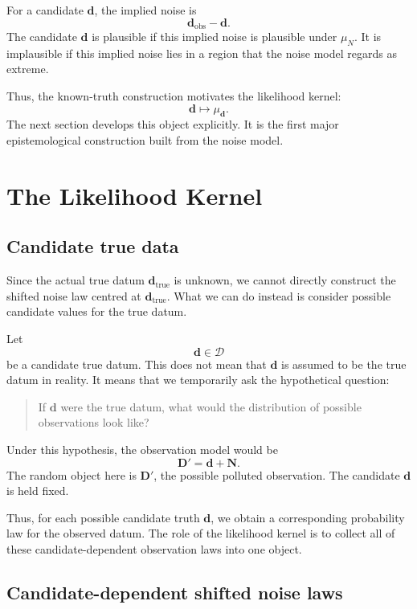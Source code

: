 \documentclass[11pt]{article}
\newcommand{\Dspace}{\mathcal D}
\newcommand{\muN}{\mu_N}
\newcommand{\Dobsrand}{\mathbf D'}
\newcommand{\Nrand}{\mathbf N}
\newcommand{\dtrue}{\mathbf d_{\mathrm{true}}}
\newcommand{\dobs}{\mathbf d_{\mathrm{obs}}}
\begin{document}
For a candidate \(\mathbf d\), the implied noise is
\[
    \dobs-\mathbf d.
\]
The candidate \(\mathbf d\) is plausible if this implied noise is plausible under \(\muN\). It is implausible if this implied noise lies in a region that the noise model regards as extreme.

Thus, the known-truth construction motivates the likelihood kernel:
\[
    \mathbf d
    \longmapsto
    \mu_{\mathbf d}.
\]
The next section develops this object explicitly. It is the first major epistemological construction built from the noise model.

\section{The Likelihood Kernel}

\subsection{Candidate true data}

Since the actual true datum \(\dtrue\) is unknown, we cannot directly construct the shifted noise law centred at \(\dtrue\). What we can do instead is consider possible candidate values for the true datum.

Let
\[
    \mathbf d\in\Dspace
\]
be a candidate true datum. This does not mean that \(\mathbf d\) is assumed to be the true datum in reality. It means that we temporarily ask the hypothetical question:

\begin{quote}
    If \(\mathbf d\) were the true datum, what would the distribution of possible observations look like?
\end{quote}

Under this hypothesis, the observation model would be
\[
    \Dobsrand = \mathbf d + \Nrand.
\]
The random object here is \(\Dobsrand\), the possible polluted observation. The candidate \(\mathbf d\) is held fixed.

Thus, for each possible candidate truth \(\mathbf d\), we obtain a corresponding probability law for the observed datum. The role of the likelihood kernel is to collect all of these candidate-dependent observation laws into one object.

\subsection{Candidate-dependent shifted noise laws}
\end{document}
